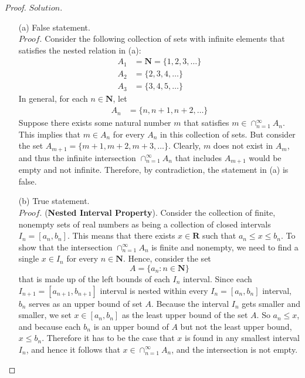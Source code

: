 \documentclass{article}
\begin{document}
\begin{proof}
$Solution.$
\begin{enumerate}
    \item[(a)]
    False statement.\\
    $Proof.$ Consider the following collection of sets with infinite elements that satisfies the nested relation in (a):
    \begin{align*}
        A_1 & = \mathbf{N} = \{1, 2, 3, \ldots\} \\
        A_2 & = \{2, 3, 4, \ldots\} \\
        A_3 & = \{3, 4, 5, \ldots\}
    \end{align*}
    In general, for each $n \in \mathbf{N}$, let
    \begin{align*}
        A_n & = \{n,n+1,n+2,\ldots\}
    \end{align*}
    Suppose there exists some natural number $m$ that satisfies $m \in \cap_{n=1}^\infty A_n$. This implies that $m \in A_n$ for every $A_n$ in this collection of sets. But consider the set $A_{m+1} = \{m+1, m+2, m+3, \ldots\}$. Clearly, $m$ does not exist in $A_m$, and thus the infinite intersection $\cap_{n=1}^\infty A_n$ that includes $A_{m+1}$ would be empty and not infinite. Therefore, by contradiction, the statement in (a) is false.
    
    \item[(b)]
    True statement.\\
    $Proof.$ ({\bf Nested Interval Property}). Consider the collection of finite, nonempty sets of real numbers as being a collection of closed intervals $I_n = [a_n, b_n]$. This means that there exists $x \in \mathbf{R}$ such that $a_n \leq x \leq b_n$. To show that the intersection $\cap_{n=1}^\infty A_n$ is finite and nonempty, we need to find a single $x \in I_n$ for every $n \in \mathbf{N}$.
    Hence, consider the set
    \begin{equation*}
        A = \{a_n : n \in \mathbf{N}\}
    \end{equation*}
    that is made up of the left bounds of each $I_n$ interval. Since each $I_{n+1} = [a_{n+1}, b_{n+1}]$ interval is nested within every $I_n = [a_n, b_n]$ interval, $b_n$ serves as an upper bound of set $A$. Because the interval $I_n$ gets smaller and smaller, we set $x \in [a_n, b_n]$ as the least upper bound of the set $A$. So $a_n \leq x$, and because each $b_n$ is an upper bound of $A$ but not the least upper bound, $x \leq b_n$. Therefore it has to be the case that $x$ is found in any smallest interval $I_n$, and hence it follows that $x \in \cap_{n=1}^\infty A_n$, and the intersection is not empty.
\end{enumerate}

\end{proof}
\end{document}

